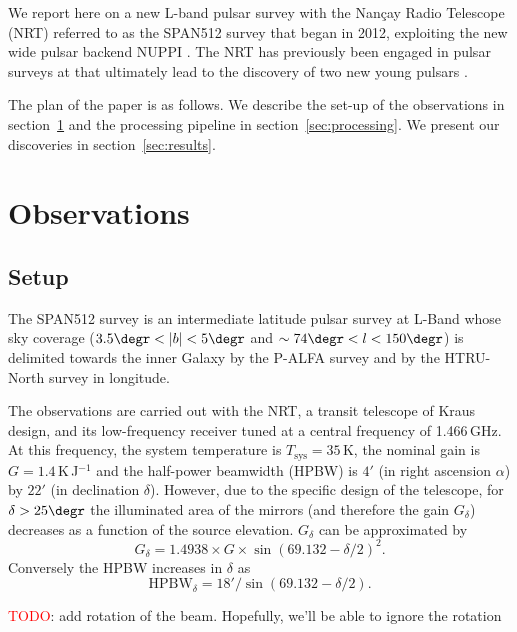 \documentclass[a4paper,fleqn,usenatbib]{mnras}
\newcommand{\TODO}{\textcolor{red}{TODO}}
\begin{document}
We report here on a new L-band pulsar survey with the Nan\c cay Radio
Telescope (NRT) referred to as the SPAN512 survey that began in 2012,
exploiting the new wide pulsar backend NUPPI \citep{dbc+11}. The NRT
has previously been engaged in pulsar surveys at \citep{frc+97} that
ultimately lead to the discovery of two new young pulsars
\citep{tpc+11}.

The plan of the paper is as follows. We describe the set-up of the
observations in section~\ref{sec:obs} and the processing pipeline in
section~\ref{sec:processing}. We present our discoveries in
section~\ref{sec:results}.

\section{Observations}
\label{sec:obs}

\subsection{Setup}

The SPAN512 survey is an intermediate latitude pulsar survey at L-Band whose sky
coverage ($3.5\degr < |b| < 5\degr$ and $\sim 74\degr < l < 150\degr$)
is delimited towards the inner Galaxy by the P-ALFA survey
\citep{cfl+06,lbh+15} and by the HTRU-North survey \citep{bck+13} in
longitude.

The observations are carried out with the NRT, a transit telescope of
Kraus design, and its low-frequency receiver tuned at a central
frequency of 1.466\,GHz. At this frequency, the system temperature is
$T_{\text{sys}} = 35$\,K, the nominal gain is $G=1.4$\,K\,J$^{-1}$ and
the half-power beamwidth (HPBW) is $4'$ (in right ascension $\alpha$) by $22'$ (in
declination $\delta$). However, due to the specific design of the
telescope, for $\delta > 25\degr$ the illuminated area of the mirrors
(and therefore the gain $G_\delta$) decreases as a function of the
source elevation. $G_\delta$ can be approximated by
\begin{equation}
G_\delta = 1.4938 \times G \times \sin \left(69.132-\delta/2 \right)^2.
\end{equation}
Conversely the HPBW  increases in $\delta$ as 
\begin{equation}
\text{HPBW}_\delta = 18' / \sin \left(69.132 - \delta/2 \right).
\end{equation}

\TODO: add rotation of the beam. Hopefully, we'll be able to ignore the rotation
\end{document}

